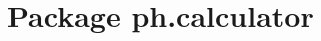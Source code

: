 \hypertarget{namespaceph_1_1calculator}{}\section{Package ph.\+calculator}
\label{namespaceph_1_1calculator}
